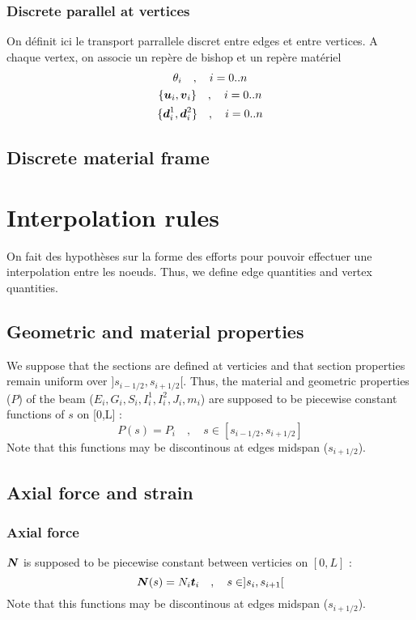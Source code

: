 \subsubsection{Discrete parallel at vertices}

On définit ici le transport parrallele discret entre edges et entre vertices.
A chaque vertex, on associe un repère de bishop et un repère matériel
\begin{subequations}
	\begin{gather}
		\theta_i \quad , \quad i=0..n \\
		\{\boldsymbol{u}_i, \boldsymbol{v}_i\} \quad , \quad i=0..n \\
		\{\boldsymbol{d}^1_{i}, \boldsymbol{d}^2_{i}\} \quad , \quad i=0..n
	\end{gather}
\end{subequations}

\subsection{Discrete material frame}


\section{Interpolation rules}

On fait des hypothèses sur la forme des efforts pour pouvoir effectuer une interpolation entre les noeuds.
Thus, we define edge quantities and vertex quantities.

\subsection{Geometric and material properties}
We suppose that the sections are defined at verticies and that section properties remain uniform over $]s_{i-1/2}, s_{i+1/2}[$. Thus, the material and geometric properties ($P$) of the beam ($E_i, G_i, S_i, I^1_{i}, I^2_{i}, J_i, m_i$) are supposed to be piecewise constant functions of $s$ on [0,L] :
\begin{equation}
	P(s) = P_i \quad , \quad s \in [s_{i-1/2},s_{i+1/2}]
\end{equation}
Note that this functions may be discontinous at edges midspan ($s_{i+1/2}$).

\subsection{Axial force and strain}

\subsubsection{Axial force}
$\boldsymbol{N}$ is supposed to be piecewise constant between verticies on $[0,L]$ :
\begin{equation}
	\boldsymbol{N}(s) = N_i \boldsymbol{t}_i \quad , \quad s \in ]s_i,s_{i+1}[
\end{equation}
Note that this functions may be discontinous at edges midspan ($s_{i+1/2}$).


